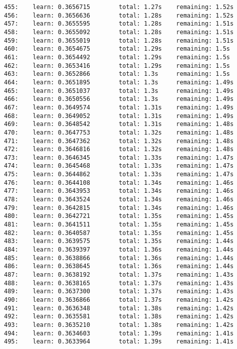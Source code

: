 \documentclass[11pt]{article}
\begin{document}
\begin{Verbatim}[commandchars=\\\{\}]
455:    learn: 0.3656715        total: 1.27s    remaining: 1.52s
456:    learn: 0.3656636        total: 1.28s    remaining: 1.52s
457:    learn: 0.3655595        total: 1.28s    remaining: 1.51s
458:    learn: 0.3655092        total: 1.28s    remaining: 1.51s
459:    learn: 0.3655019        total: 1.28s    remaining: 1.51s
460:    learn: 0.3654675        total: 1.29s    remaining: 1.5s
461:    learn: 0.3654492        total: 1.29s    remaining: 1.5s
462:    learn: 0.3653416        total: 1.29s    remaining: 1.5s
463:    learn: 0.3652866        total: 1.3s     remaining: 1.5s
464:    learn: 0.3651895        total: 1.3s     remaining: 1.49s
465:    learn: 0.3651037        total: 1.3s     remaining: 1.49s
466:    learn: 0.3650556        total: 1.3s     remaining: 1.49s
467:    learn: 0.3649574        total: 1.31s    remaining: 1.49s
468:    learn: 0.3649052        total: 1.31s    remaining: 1.49s
469:    learn: 0.3648542        total: 1.31s    remaining: 1.48s
470:    learn: 0.3647753        total: 1.32s    remaining: 1.48s
471:    learn: 0.3647362        total: 1.32s    remaining: 1.48s
472:    learn: 0.3646816        total: 1.32s    remaining: 1.48s
473:    learn: 0.3646345        total: 1.33s    remaining: 1.47s
474:    learn: 0.3645468        total: 1.33s    remaining: 1.47s
475:    learn: 0.3644862        total: 1.33s    remaining: 1.47s
476:    learn: 0.3644108        total: 1.34s    remaining: 1.46s
477:    learn: 0.3643953        total: 1.34s    remaining: 1.46s
478:    learn: 0.3643524        total: 1.34s    remaining: 1.46s
479:    learn: 0.3642815        total: 1.34s    remaining: 1.46s
480:    learn: 0.3642721        total: 1.35s    remaining: 1.45s
481:    learn: 0.3641511        total: 1.35s    remaining: 1.45s
482:    learn: 0.3640587        total: 1.35s    remaining: 1.45s
483:    learn: 0.3639575        total: 1.35s    remaining: 1.44s
484:    learn: 0.3639397        total: 1.36s    remaining: 1.44s
485:    learn: 0.3638866        total: 1.36s    remaining: 1.44s
486:    learn: 0.3638645        total: 1.36s    remaining: 1.44s
487:    learn: 0.3638192        total: 1.37s    remaining: 1.43s
488:    learn: 0.3638165        total: 1.37s    remaining: 1.43s
489:    learn: 0.3637300        total: 1.37s    remaining: 1.43s
490:    learn: 0.3636866        total: 1.37s    remaining: 1.42s
491:    learn: 0.3636348        total: 1.38s    remaining: 1.42s
492:    learn: 0.3635581        total: 1.38s    remaining: 1.42s
493:    learn: 0.3635210        total: 1.38s    remaining: 1.42s
494:    learn: 0.3634603        total: 1.39s    remaining: 1.41s
495:    learn: 0.3633964        total: 1.39s    remaining: 1.41s

\end{Verbatim}
\end{document}
